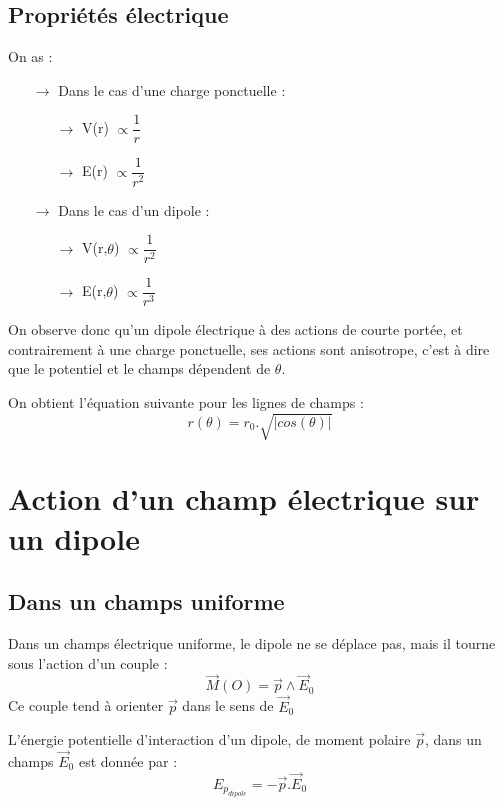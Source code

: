 \section{Propriétés électrique}
On as : 
\begin{itemize}
 \item[$\rightarrow$] Dans le cas d'une charge ponctuelle : 
\begin{itemize}
 \item[$\rightarrow$] V(r) $\propto \dfrac{1}{r}$
\item[$\rightarrow$] E(r) $\propto \dfrac{1}{r^2}$
\end{itemize}
 \item[$\rightarrow$] Dans le cas d'un dipole : 
\begin{itemize}
 \item[$\rightarrow$] V(r,$\theta$) $\propto \dfrac{1}{r^2}$
 \item[$\rightarrow$] E(r,$\theta$) $\propto \dfrac{1}{r^3}$
\end{itemize}
\end{itemize}
On observe donc qu'un dipole électrique à des actions de courte portée, et contrairement à une charge ponctuelle, ses actions sont anisotrope, c'est à dire que le potentiel et le champs dépendent de $\theta$.
\begin{prop}
On obtient l'équation suivante pour les lignes de champs : 
$$r(\theta) = r_0.\sqrt{|cos(\theta)|}$$ 
\end{prop}
\chapter{Action d'un champ électrique sur un dipole}
\section{Dans un champs uniforme}
\begin{prop}
Dans un champs électrique uniforme, le dipole ne se déplace pas, mais il tourne sous l'action d'un couple : $$\overrightarrow{M}(O) = \overrightarrow{p}\wedge\overrightarrow{E}_0$$
Ce couple tend à orienter $\overrightarrow{p}$ dans le sens de $\overrightarrow{E}_0$
\end{prop}
\begin{prop}
L'énergie potentielle d'interaction d'un dipole, de moment polaire $\overrightarrow{p}$, dans un champs $\overrightarrow{E}_0$ est donnée par : 
$$E_{p_{dipole}} = -\overrightarrow{p}.\overrightarrow{E}_0$$ 
\end{prop}
